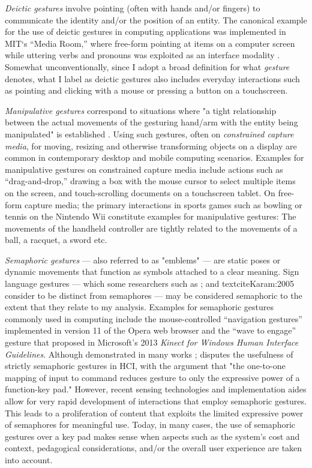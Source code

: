 \emph{Deictic gestures} involve pointing (often with hands and/or fingers) to communicate the identity and/or the position of an entity. The canonical example for the use of deictic gestures in computing applications was implemented in MIT‘s “Media Room,” where free-form pointing at items on a computer screen while uttering verbs and pronouns was exploited as an interface modality \parencite{Bolt:1980}. Somewhat unconventionally, since I adopt a broad definition for what \emph{gesture} denotes, what I label as deictic gestures also includes everyday interactions such as pointing and clicking with a mouse or pressing a button on a touchscreen.

\emph{Manipulative gestures} correspond to situations where "a tight relationship between the actual movements of the gesturing hand/arm with the entity being manipulated" is established \parencite{Quek:2002}. Using such gestures, often on \emph{constrained capture media}, for moving, resizing and otherwise transforming objects on a display are common in contemporary desktop and mobile computing scenarios. Examples for manipulative gestures on constrained capture media include actions such as “drag-and-drop,” drawing a box with the mouse cursor to select multiple items on the screen, and touch-scrolling documents on a touchscreen tablet. On free-form capture media; the primary interactions in sports games such as bowling or tennis on the Nintendo Wii constitute examples for manipulative gestures: The movements of the handheld controller are tightly related to the movements of a ball, a racquet, a sword etc.

\emph{Semaphoric gestures} --- also referred to as "emblems" \textcite{McNeill:2008} --- are static poses or dynamic movements that function as symbols attached to a clear meaning. Sign language gestures --- which some researchers such as \textcite{McNeill:2008}; and textcite{Karam:2005} consider to be distinct from semaphores --- may be considered semaphoric to the extent that they relate to my analysis. Examples for semaphoric gestures commonly used in computing include the mouse-controlled “navigation gestures” implemented in version 11 of the Opera web browser and the “wave to engage” gesture that proposed in Microsoft's 2013 \emph{Kinect for Windows Human Interface Guidelines}.
Although demonstrated in many works \parencite{Cao:2003, Lenman:2002, Wilson:2003}; \textcite{Wexelblat:1995} disputes the usefulness of strictly semaphoric gestures in HCI, with the argument that "the one-to-one mapping of input to command reduces gesture to only the expressive power of a function-key pad." However, recent sensing technologies and implementation aides allow for very rapid development of interactions that employ semaphoric gestures. This leads to a proliferation of content that exploits the limited expressive power of semaphores for meaningful use. Today, in many cases, the use of semaphoric gestures over a key pad makes sense when aspects such as the system's cost and context, pedagogical considerations, and/or the overall user experience \parencite{Fogtmann:2008} are taken into account.

